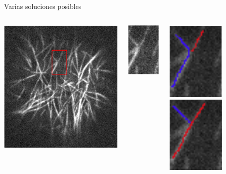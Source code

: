 \documentclass[aspectratio=169]{beamer}
\begin{document}
\begin{frame}{Varias soluciones posibles}
  \begin{columns}
    \begin{column}{0.6\textwidth}
        \centering
        \includegraphics[scale=0.5]{Pictures/NoConsenso.png}
    \end{column}
    \begin{column}{0.2\textwidth}
        \includegraphics[scale=0.5]{Pictures/NoConsenso2.png}
    \end{column}
    \begin{column}{0.2\textwidth}
        \includegraphics[scale=0.5]{Pictures/NoConsenso3.png}
        \vspace{0.5cm}
        \includegraphics[scale=0.5]{Pictures/NoConsenso4.png}
    \end{column}
    \begin{column}{0.2\textwidth}
    \end{column}
\end{columns}
\end{frame}
\end{document}
